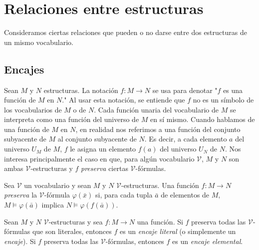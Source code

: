 \documentclass[12pt,a4paper]{book}
\newcommand{\comillas}[1]{"#1"}
\newcommand{\VV}{\mathcal{V}}
\begin{document}
    \section{Relaciones entre estructuras}

    Consideramos ciertas relaciones que pueden o no darse entre dos estructuras de un mismo vocabulario.

    \subsection{Encajes}

    Sean $M$ y $N$ estructuras. La notación $f:M\rightarrow N$ se usa para denotar \comillas{$f$ es una función de $M$ en
    $N$.} Al usar esta notación, se entiende que $f$ no es un símbolo de los vocabularios de $M$ o de $N$. Cada función
    unaria del vocabulario de $M$ se interpreta como una función del universo de $M$ en sí mismo. Cuando hablamos de una
    función de $M$ en $N$, en realidad nos referimos a una función del conjunto subyacente de $M$ al conjunto subyacente de
    $N$. Es decir, a cada elemento $a$ del universo $U_{M}$ de $M$, $f$ le asigna un elemento $f(a)$ del universo $U_{N}$ de
    $N$. Nos interesa principalmente el caso en que, para algún vocabulario $\VV$, $M$ y $N$ son ambas $\VV$-estructuras y
    $f$ \textit{preserva} ciertas $\VV$-fórmulas.

    \begin{definicion}[Preservación]\label{def:preserva-formula}
        Sea $\VV$ un vocabulario y sean $M$ y $N$ $\VV$-estructuras. Una función $f:M\rightarrow N$ \textit{preserva} la
        $\VV$-fórmula $\varphi(\bar{x})$ si, para cada tupla $\bar{a}$ de elementos de $M$, $M\models\varphi(\bar{a})$
        implica $N\models\varphi(f(\bar{a}))$.
    \end{definicion}

    \begin{definicion}[Encaje]\label{def:encaje-literal-elemental}
        Sean $M$ y $N$ $\VV$-estructuras y sea $f:M\rightarrow N$ una función. Si $f$ preserva todas las $\VV$-fórmulas
        que son literales, entonces $f$ es un \textit{encaje literal} (o simplemente un \textit{encaje}). Si $f$ preserva
        todas las $\VV$-fórmulas, entonces $f$ es un \textit{encaje elemental}.
    \end{definicion}
\end{document}
